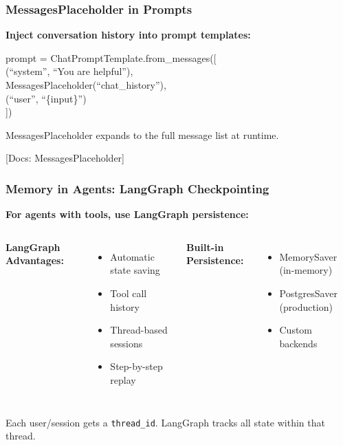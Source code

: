\documentclass[aspectratio=169,11pt]{beamer}
\newcommand{\docref}[1]{{\scriptsize\color{docgray}[Docs: #1]}}
\begin{document}
\begin{frame}
  \frametitle{MessagesPlaceholder in Prompts}
  \textbf{Inject conversation history into prompt templates:}
  \vspace{0.6em}
  \begin{codebox}
    \ttfamily\small
    prompt = ChatPromptTemplate.from\_messages([ \\
    \hspace{2em} (``system'', ``You are helpful''), \\
    \hspace{2em} MessagesPlaceholder(``chat\_history''), \\
    \hspace{2em} (``user'', ``\{input\}'') \\
    ])
  \end{codebox}
  \vspace{0.6em}
  \begin{conceptbox}
    MessagesPlaceholder expands to the full message list at runtime.
  \end{conceptbox}
  \docref{MessagesPlaceholder}
\end{frame}

\begin{frame}
  \frametitle{Memory in Agents: LangGraph Checkpointing}
  \textbf{For agents with tools, use LangGraph persistence:}
  \vspace{0.6em}
  \begin{columns}
    \textbf{LangGraph Advantages:}
    \begin{itemize}
      \item Automatic state saving
      \item Tool call history
      \item Thread-based sessions
      \item Step-by-step replay
    \end{itemize}

    \textbf{Built-in Persistence:}
    \begin{itemize}
      \item MemorySaver (in-memory)
      \item PostgresSaver (production)
      \item Custom backends
    \end{itemize}
  \end{columns}
  \vspace{0.8em}
  \begin{conceptbox}
    Each user/session gets a \texttt{thread\_id}. LangGraph tracks all state within that thread.
  \end{conceptbox}
\end{frame}
\end{document}
